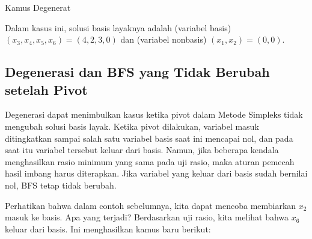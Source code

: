 \begin{remark}{Kamus Degenerat}{}
\end{remark}

Dalam kasus ini, solusi basis layaknya adalah (variabel basis) $(x_3,x_4, x_5,x_6) = (4,2,3,0)$ dan (variabel nonbasis) $(x_1, x_2) = (0,0)$.

\subsection{Degenerasi dan BFS yang Tidak Berubah setelah Pivot}
Degenerasi dapat menimbulkan kasus ketika pivot dalam Metode Simpleks tidak mengubah solusi basis layak. Ketika pivot dilakukan, variabel masuk ditingkatkan sampai salah satu variabel basis saat ini mencapai nol, dan pada saat itu variabel tersebut keluar dari basis. Namun, jika beberapa kendala menghasilkan rasio minimum yang sama pada uji rasio, maka aturan pemecah hasil imbang harus diterapkan. Jika variabel yang keluar dari basis sudah bernilai nol, BFS tetap tidak berubah. 

Perhatikan bahwa dalam contoh sebelumnya, kita dapat mencoba membiarkan $x_2$ masuk ke basis. Apa yang terjadi? Berdasarkan uji rasio, kita melihat bahwa $x_6$ keluar dari basis. Ini menghasilkan kamus baru berikut:

